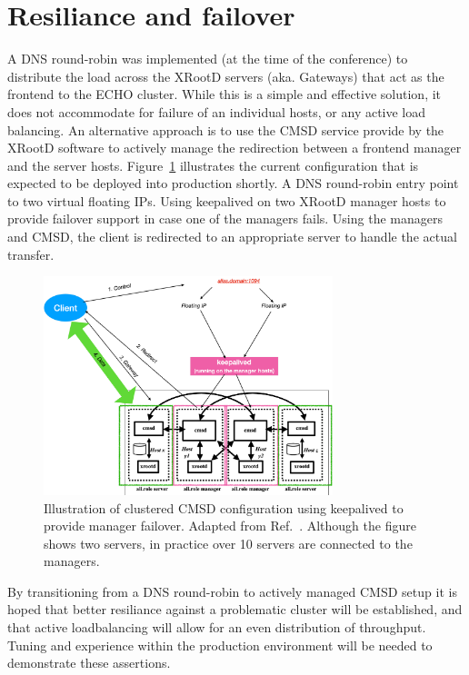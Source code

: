 \documentclass{webofc}
\begin{document}
\section{Resiliance and failover\label{sec:cmsd}}
A DNS round-robin was implemented (at the time of the conference) to distribute the load across the XRootD servers (aka. Gateways) that act as the frontend to the ECHO cluster. While this is a simple and effective solution, it does not accommodate for failure of an individual hosts, or any active load balancing. An alternative approach is to use the CMSD service provide by the XRootD software to actively manage the redirection between a frontend manager and the server hosts. 
%
Figure~\ref{fig:cmsd} illustrates the current configuration that is expected to be deployed into production shortly. A DNS round-robin entry point to two virtual floating IPs. Using keepalived on two XRootD manager hosts to provide failover support in case one of the managers fails. Using the managers and CMSD, the client is redirected to an appropriate server to handle the actual transfer.  
\begin{figure}[h]
     \centering
     \includegraphics[width=0.75\textwidth,clip]{figures/cmsd.pdf}\hfil
     \caption{Illustration of clustered CMSD configuration using keepalived to provide manager failover. Adapted from Ref.~\cite{xrdcmsd}. Although the figure shows two servers, in practice over 10 servers are connected to the managers.}
     \label{fig:cmsd}       %
\end{figure}

By transitioning from a DNS round-robin to actively managed CMSD setup it is hoped that better resiliance against a problematic cluster will be established, and that active loadbalancing will allow for an even distribution of throughput. Tuning and experience within the production environment will be needed to demonstrate these assertions. 
\end{document}

